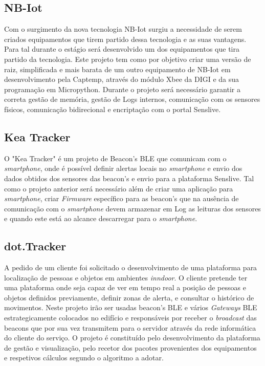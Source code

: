 \subsection{NB-Iot}
Com o surgimento da nova tecnologia NB-Iot surgiu a necessidade de serem criados equipamentos que tirem partido dessa tecnologia e as suas vantagens. Para tal durante o estágio será desenvolvido um dos equipamentos que tira partido da tecnologia. Este projeto tem como por objetivo criar uma versão de raiz, simplificada e mais barata de um outro equipamento de NB-Iot em desenvolvimento pela Captemp, através do módulo Xbee da DIGI e da sua programação em Micropython. Durante o projeto será necessário garantir a correta gestão de memória, gestão de Logs internos, comunicação com os sensores físicos, comunicação bidirecional e encriptação com o portal Senslive.
\subsection{Kea Tracker}
O "Kea Tracker" é um projeto de Beacon’s BLE que comunicam com o \textit{smartphone}, onde é possível definir alertas locais no \textit{smartphone} e envio dos dados obtidos dos sensores das beacon’s e envio para a plataforma Senslive.
Tal como o projeto anterior será necessário além de criar uma aplicação para \textit{smartphone}, criar \textit{Firmware} específico para as beacon’s que na ausência de comunicação com o \textit{smartphone} devem armazenar em Log as leituras dos sensores e quando este está ao alcance descarregar para o \textit{smartphone}.
\subsection{dot.Tracker}
A pedido de um cliente foi solicitado o desenvolvimento de uma plataforma para localização de pessoas e objetos em ambientes \textit{inndoor}. O cliente pretende ter uma plataforma onde seja capaz de ver em tempo real a posição de pessoas e objetos definidos previamente, definir zonas de alerta, e consultar o histórico de movimentos. Neste projeto irão ser usadas beacon's BLE e vários \textit{Gateways} BLE estrategicamente colocados no edifício e responsáveis por receber o \textit{broadcast} das beacons que por sua vez transmitem para o servidor através da rede informática do cliente do serviço. O projeto é constituído pelo desenvolvimento da plataforma de gestão e visualização, pelo recetor dos pacotes provenientes dos equipamentos e respetivos cálculos segundo o algoritmo a adotar.

